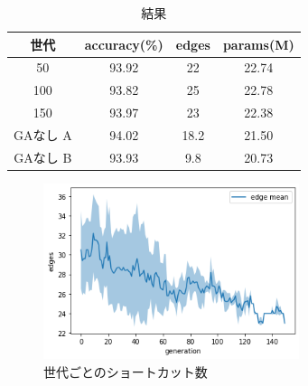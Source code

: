 \documentclass[twocolumn]{jarticle}     %
\begin{document}
\begin{table}[tb]
  \begin{center}
    \caption{結果}
    \begin{tabular}{|c|c|c|c|} \hline
      世代 & accuracy(\%) & edges & params(M) \\ \hline\hline
      50 & 93.92 & 22 & 22.74 \\ \hline
      100 & 93.82 & 25 & 22.78 \\ \hline
      150 & 93.97 & 23 & 22.38 \\ \hline\hline
      GAなし A & 94.02 & 18.2 & 21.50 \\ \hline
      GAなし B & 93.93 & 9.8 & 20.73 \\ \hline
    \end{tabular}
    \label{tab:result_ga}
  \end{center}
\end{table}

\begin{figure}[tb]
  \begin{center}
    \includegraphics[clip,width=75mm]{edge.png}
    \caption{世代ごとのショートカット数}
    \label{fig:edge}
  \end{center}
\end{figure}
\end{document}
